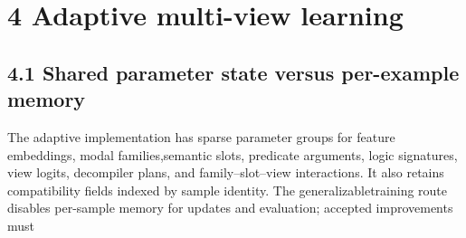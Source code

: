\section*{4  Adaptive multi-view learning}
\subsection*{4.1  Shared parameter state versus per-example memory}
\noindent
The adaptive implementation has sparse parameter groups for feature embeddings, modal families,\linebreak[4]
semantic slots, predicate arguments, logic signatures, view logits, decompiler plans, and family--slot--\linebreak[4]
view interactions. It also retains compatibility fields indexed by sample identity. The generalizable\linebreak[4]
training route disables per-sample memory for updates and evaluation; accepted improvements must\par

